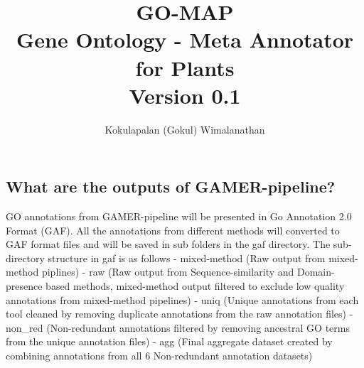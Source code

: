 \documentclass[11pt,letterpaper]{article}
\title{
  \textbf{GO-MAP} \\
  \Large{ \textbf{G}ene \textbf{O}ntology - \textbf{M}eta \textbf{A}nnotator for \textbf{P}lants} \\
  \large {Version 0.1}
}
\author{Kokulapalan (Gokul) Wimalanathan}
\begin{document}

\maketitle
\newpage










\subsection{What are the outputs of GAMER-pipeline?}

GO annotations from GAMER-pipeline will be presented in Go Annotation
2.0 Format (GAF). All the annotations from different methods will
converted to GAF format files and will be saved in sub folders in the
gaf directory. The sub-directory structure in gaf is as follows -
mixed-method (Raw output from mixed-method piplines) - raw (Raw output
from Sequence-similarity and Domain-presence based methods, mixed-method
output filtered to exclude low quality annotations from mixed-method
pipelines) - uniq (Unique annotations from each tool cleaned by removing
duplicate annotations from the raw annotation files) - non\_red
(Non-redundant annotations filtered by removing ancestral GO terms from
the unique annotation files) - agg (Final aggregate dataset created by
combining annotations from all 6 Non-redundant annotation datasets)
\end{document}
